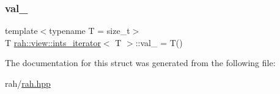 \subsubsection{\texorpdfstring{val\_}{val\_}}
{\footnotesize\ttfamily template$<$typename T  = size\+\_\+t$>$ \\
T \mbox{\hyperlink{structrah_1_1view_1_1ints__iterator}{rah\+::view\+::ints\+\_\+iterator}}$<$ T $>$\+::val\+\_\+ = T()}



The documentation for this struct was generated from the following file\+:\begin{DoxyCompactItemize}
\item 
rah/\mbox{\hyperlink{rah_8hpp}{rah.\+hpp}}\end{DoxyCompactItemize}
